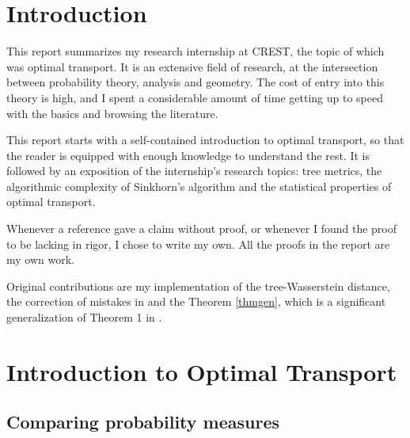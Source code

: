 \documentclass[12pt]{report}
\theoremstyle{definition}
\theoremstyle{remark}
\begin{document}
\tableofcontents
\newpage\phantom{blabla}
\onehalfspacing

\chapter*{Introduction}

\hspace{\parindent}This report summarizes my research internship at CREST, the topic of which was optimal transport. It is an extensive field of research, at the intersection between probability theory, analysis and geometry. The cost of entry into this theory is high, and I spent a considerable amount of time getting up to speed with the basics and browsing the literature.\\
\par This report starts with a self-contained introduction to optimal transport, so that the reader is equipped with enough knowledge to understand the rest. It is followed by an exposition of the internship's research topics: tree metrics, the algorithmic complexity of Sinkhorn's algorithm and the statistical properties of optimal transport.\\
\par Whenever a reference gave a claim without proof, or whenever I found the proof to be lacking in rigor, I chose to write my own. All the proofs in the report are my own work.\\
\par Original contributions are my implementation of the tree-Wasserstein distance, the correction of mistakes in \cite{altschuler2017near} and the Theorem \ref{thmgen}, which is a significant generalization of Theorem 1 in \cite{genevay2018sample}.



\onehalfspacing
\chapter{Introduction to Optimal Transport}

\section{Comparing probability measures}
\end{document}
